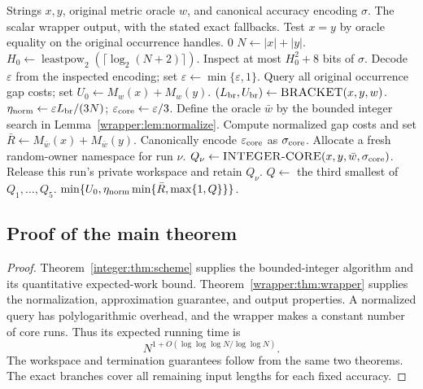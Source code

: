 \documentclass[11pt]{article}
\newenvironment{wedalgorithm}[2]{%
  \begin{algorithm}[!htbp]%
  \caption{#1}\label{#2}%
  \small\begin{algorithmic}[1]%
}{%
  \end{algorithmic}\end{algorithm}%
}
\theoremstyle{definition}
\newcommand{\eps}{\varepsilon}
\newcommand{\1}{\mathbf 1}
\begin{document}
\begin{wedalgorithm}{The original-metric wrapper}{alg:metric-scheme}
\Require Strings $x,y$, original metric oracle $w$, and canonical accuracy encoding $\sigma$.
\Ensure The scalar wrapper output, with the stated exact fallbacks.
  \State Test $x=y$ by oracle equality on the original occurrence handles.
   \State \Return $0$ \EndIf
    \State \Return {}
  \EndIf
  \State $N\gets|x|+|y|$.
  \State $H_0\gets\operatorname{leastpow}_2(\lceil\log_2(N+2)\rceil)$.
  \State Inspect at most $H_0^2+8$ bits of $\sigma$.
    \State \Return {}
  \EndIf
  \State Decode $\eps$ from the inspected encoding; set $\eps\gets\min\{\eps,1\}$.
  \If{$\eps N<361$} \State \Return {} \EndIf
  \State Query all original occurrence gap costs; set $U_0\gets M_w(x)+M_w(y)$.
  \State $(L_{\rm br},U_{\rm br})\gets\Call{BRACKET}{x,y,w}$.
  \State $\eta_{\rm norm}\gets\eps L_{\rm br}/(3N)$; $\varepsilon_{\rm core}\gets\eps/3$.
  \State Define the oracle $\bar w$ by the bounded integer search in Lemma~\ref{wrapper:lem:normalize}.
  \State Compute normalized gap costs and set $\bar R\gets M_{\bar w}(x)+M_{\bar w}(y)$.
  \State Canonically encode $\varepsilon_{\rm core}$ as $\sigma_{\rm core}$.
    \State Allocate a fresh random-owner namespace for run $\nu$.
    \State $Q_\nu\gets\Call{INTEGER-CORE}{x,y,\bar w,\sigma_{\rm core}}$.
    \State Release this run's private workspace and retain $Q_\nu$.
  \EndFor
  \State $Q\gets$ the third smallest of $Q_1,\ldots,Q_{5}$.
  \State \Return $\min\{U_0,\eta_{\rm norm}\min\{\bar R,\max\{1,Q\}\}\}$.
\EndProcedure
\end{wedalgorithm}


\subsection{Proof of the main theorem}
\begin{proof}
Theorem~\ref{integer:thm:scheme} supplies the bounded-integer algorithm and its quantitative expected-work bound. Theorem~\ref{wrapper:thm:wrapper} supplies the normalization, approximation guarantee, and output properties. A normalized query has polylogarithmic overhead, and the wrapper makes a constant number of core runs. Thus its expected running time is
\[
 N^{1+O(\log\log\log N/\log\log N)}.
\]
The workspace and termination guarantees follow from the same two theorems. The exact branches cover all remaining input lengths for each fixed accuracy.
\end{proof}
\end{document}
